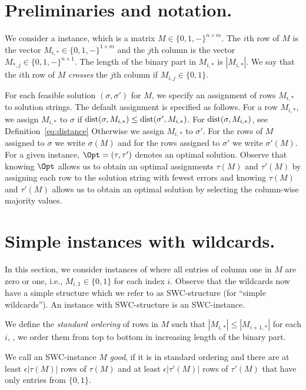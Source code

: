 \section{Preliminaries and notation.}\label{sec:prelim}

We consider a \GMEC instance, which is a matrix $M \in \{0,1, -\}^{n \times m}$.
The $i$th row of $M$ is the vector $M_{i,*} \in \{0,1, -\}^{1 \times m}$ and the $j$th column is the vector $M_{*,j} \in \{0,1, -\}^{n \times 1}$.
The length of the binary part in $M_{i,*}$ is $|M_{i,*}|$. 
We say that the $i$th row of $M$ \emph{crosses} the $j$th column if $M_{i,j} \in \{0,1\}$.

For each feasible solution $(\sigma,\sigma')$ for $M$, we specify an assignment of rows $M_{i,*}$ to solution strings.
The default assignment is specified as follows.
For a row $M_{i,*}$, we assign $M_{i,*}$ to $\sigma$ if $\mathrm{dist}(\sigma,M_{i,*}) \le \mathrm{dist}(\sigma',M_{i,*})$. For $\mathrm{dist}(\sigma,M_{i,*})$, see Definition~\ref{eq:distance}
Otherwise we assign $M_{i,*}$ to $\sigma'$.
For the rows of $M$ assigned to $\sigma$ we write $\sigma(M)$ and for the rows assigned to $\sigma'$ we write $\sigma'(M)$.
For a given instance, $\Opt = (\tau, \tau')$ denotes an optimal solution.
Observe that knowing $\Opt$ allows us to obtain an optimal assignments $\tau(M)$ and $\tau'(M)$ by assigning each row to the solution string with fewest errors and knowing $\tau(M)$ and $\tau'(M)$ allows us to obtain an optimal solution by selecting the column-wise majority values.

\section{Simple instances with wildcards.}\label{sec:swc}
In this section, we consider instances of \GMEC where all entries of column one in $M$ are zero or one, i.e., $M_{i,1} \in \{0,1\}$ for each index $i$.
Observe that the wildcards now have a simple structure which we refer to as SWC-structure (for ``simple wildcards'').
An instance with SWC-structure is an SWC-instance.

\begin{definition}
    We define the \emph{standard ordering} of rows in $M$ such that $|M_{i,*}| \le |M_{i+1,*}|$ for each $i$, \ie, we order them from top to bottom in increasing length of the binary part. 
    \label{def:order-SWC}
\end{definition}

\begin{definition}
    \label{def:good-SWC}
    We call an SWC-instance $M$ \emph{good}, if it is in standard ordering and there are at least $\epsilon |\tau(M)|$ rows of $\tau(M)$ and at least $\epsilon |\tau'(M)|$ rows of $\tau'(M)$ that have only entries from $\{0,1\}$.
\end{definition}

